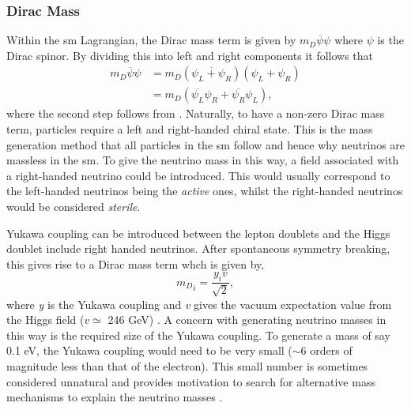 \subsubsection{Dirac Mass}
Within the \gls{sm} Lagrangian, the Dirac mass term is given by $m_D\overline{\psi}\psi$ where $\psi$ is the Dirac spinor. By dividing this into left and right components it follows that
\begin{equation}\label{eqn:Dirac mass term}
\begin{split}
    m_D\overline{\psi}\psi &= m_D(\overline{\psi_L + \psi_R})(\psi_L + \psi_R) \\
    &= m_D(\overline{\psi_L}\psi_R + \overline{\psi_R}\psi_L),
\end{split}
\end{equation} 
where the second step follows from . Naturally, to have a non-zero Dirac mass term, particles require a left and right-handed chiral state. This is the mass generation method that all particles in the \gls{sm} follow and hence why neutrinos are massless in the \gls{sm}. To give the neutrino mass in this way, a field associated with a right-handed neutrino could be introduced. This would usually correspond to the left-handed neutrinos being the \textit{active} ones, whilst the right-handed neutrinos would be considered \textit{sterile}.

Yukawa coupling can be introduced between the lepton doublets and the Higgs doublet include right handed neutrinos. After spontaneous symmetry breaking, this gives rise to a Dirac mass term whch is given by, \begin{equation}
    {m_D}_i = \frac{y_iv}{\sqrt{2}},
\end{equation}
where \textit{y} is the Yukawa coupling and \textit{v} gives the vacuum expectation value from the Higgs field ($v \simeq$ 246 GeV) \cite{peskin_and_schroeder}. A concern with generating neutrino masses in this way is the required size of the Yukawa coupling. To generate a mass of say 0.1 eV, the Yukawa coupling would need to be very small ($\sim$6 orders of magnitude less than that of the electron). This small number is sometimes considered unnatural and provides motivation to search for alternative mass mechanisms to explain the neutrino masses \cite{Fundamentals_of_Neutrino_Physics_and_Astrophysics}.

